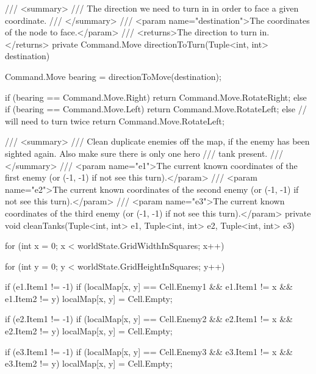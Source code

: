 \documentclass[11pt]{article}
\begin{document}
\begin{code}
{{        /// <summary>
        /// The direction we need to turn in in order to face a given coordinate.
        /// </summary>
        /// <param name="destination">The coordinates of the node to face.</param>
        /// <returns>The direction to turn in.</returns>
        private Command.Move directionToTurn(Tuple<int, int> destination)
        {
            Command.Move bearing = directionToMove(destination);

            if (bearing == Command.Move.Right)
            {
                return Command.Move.RotateRight;
            }
            else if (bearing == Command.Move.Left)
            {
                return Command.Move.RotateLeft;
            }
            else
            { // will need to turn twice
                return Command.Move.RotateLeft;
            }
        }

        /// <summary>
        /// Clean duplicate enemies off the map, if the enemy has been sighted again. Also make sure there is only one hero
        /// tank present.
        /// </summary>
        /// <param name="e1">The current known coordinates of the first enemy (or (-1, -1) if not see this turn).</param>
        /// <param name="e2">The current known coordinates of the second enemy (or (-1, -1) if not see this turn).</param>
        /// <param name="e3">The current known coordinates of the third enemy (or (-1, -1) if not see this turn).</param>
        private void cleanTanks(Tuple<int, int> e1, Tuple<int, int> e2, Tuple<int, int> e3)
        {
            for (int x = 0; x < worldState.GridWidthInSquares; x++)
            {
                for (int y = 0; y < worldState.GridHeightInSquares; y++)
                {
                    if (e1.Item1 != -1)
                    {
                        if (localMap[x, y] == Cell.Enemy1
                            && e1.Item1 != x && e1.Item2 != y)
                        {
                            localMap[x, y] = Cell.Empty;
                        }
                    }

                    if (e2.Item1 != -1)
                    {
                        if (localMap[x, y] == Cell.Enemy2
                            && e2.Item1 != x && e2.Item2 != y)
                        {
                            localMap[x, y] = Cell.Empty;
                        }
                    }

                    if (e3.Item1 != -1)
                    {
                        if (localMap[x, y] == Cell.Enemy3
                            && e3.Item1 != x && e3.Item2 != y)
                        {
                            localMap[x, y] = Cell.Empty;
                        }
                    }

}}}}}
\end{code}
\end{document}
